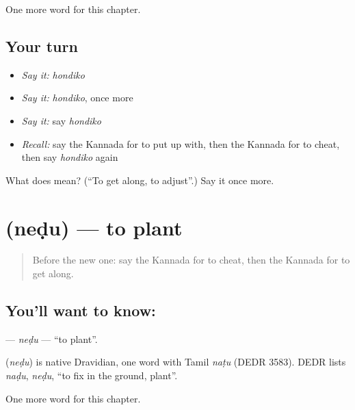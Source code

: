 \begin{grammarlens}[title={What you've built}]
One more word for this chapter.
\end{grammarlens}

\subsection*{Your turn}
\begin{itemize}
\raggedright
  \item \emph{Say it:} \emph{hondiko}
  \item \emph{Say it:} \emph{hondiko}, once more
  \item \emph{Say it:} say \emph{hondiko}
  \item \emph{Recall:} say the Kannada for to put up with, then the Kannada for to cheat, then say \emph{hondiko} again
\end{itemize}

\begin{tcolorbox}[breakable,colback=teal!4,colframe=teal!35!black,title={Before you move on}]
What does  mean? (\textquotedblleft{}To get along, to adjust\textquotedblright{}.) Say it once more.
\end{tcolorbox}
\section[\texorpdfstring{\kn{ನೆಡು} (neḍu)}{ನೆಡು (neḍu)}]{ (neḍu) — to plant}

\label{lesson:KA-C163-nedu}



\begin{quote}
Before the new one: say the Kannada for to cheat, then the Kannada for to get along.
\end{quote}

\subsection*{You'll want to know: }
\textbf{} — \emph{neḍu} — \textquotedblleft{}to plant\textquotedblright{}.

\begin{cousinweb}
\textbf{} (\emph{neḍu}) is native Dravidian, one word with Tamil \emph{naṭu} (DEDR 3583). DEDR lists \emph{naḍu}, \emph{neḍu}, \textquotedblleft{}to fix in the ground, plant\textquotedblright{}.
\end{cousinweb}

\begin{grammarlens}[title={What you've built}]
One more word for this chapter.
\end{grammarlens}

